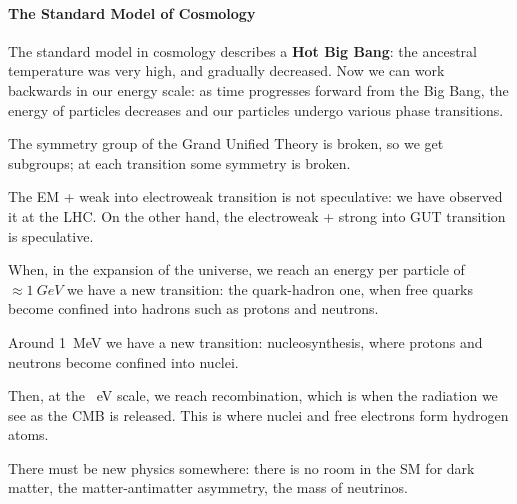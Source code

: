\documentclass[main.tex]{subfiles}
\begin{document}
\paragraph{The Standard Model of Cosmology}

The standard model in cosmology describes a \textbf{Hot Big Bang}: the ancestral temperature was very high, and gradually decreased.
Now we can work backwards in our energy scale: as time progresses forward from the Big Bang, the energy of particles decreases and our particles undergo various phase transitions. 

The symmetry group of the Grand Unified Theory is broken, so we get subgroups; at each transition some symmetry is broken. 

The EM + weak into electroweak transition is not speculative: we have observed it at the LHC. 
On the other hand, the electroweak + strong into GUT transition is speculative. 

When, in the expansion of the universe, we reach an energy per particle of \(\approx \SI{1}{GeV}\) we have a new transition: the quark-hadron one, when free quarks become confined into hadrons such as protons and neutrons.

Around \SI{1}{MeV} we have a new transition: nucleosynthesis, where protons and neutrons become confined into nuclei. 

Then, at the \SI{}{eV} scale, we reach recombination, which is when the radiation we see as the CMB is released. This is where nuclei and free electrons form hydrogen atoms. 

There must be new physics somewhere: there is no room in the SM for dark matter, the matter-antimatter asymmetry, the mass of neutrinos. 
\end{document}
